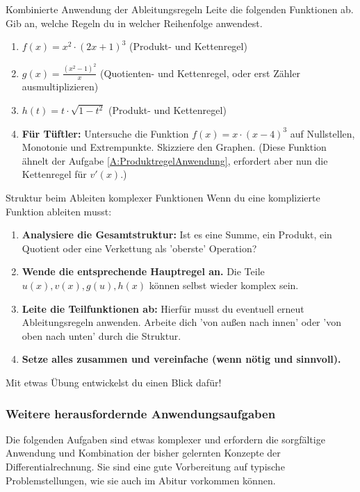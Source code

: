 \begin{aufgabenumgebung}[A:KombinierteAnwendung]{Kombinierte Anwendung der Ableitungsregeln}
Leite die folgenden Funktionen ab. Gib an, welche Regeln du in welcher Reihenfolge anwendest.
\begin{enumerate}
    \item $f(x) = x^2 \cdot (2x+1)^3$ (Produkt- und Kettenregel)
    \item $g(x) = \frac{(x^2-1)^2}{x}$ (Quotienten- und Kettenregel, oder erst Zähler ausmultiplizieren)
    \item $h(t) = t \cdot \sqrt{1-t^2}$ (Produkt- und Kettenregel)
    \item \textbf{Für Tüftler:} Untersuche die Funktion $f(x) = x \cdot (x-4)^3$ auf Nullstellen, Monotonie und Extrempunkte. Skizziere den Graphen. (Diese Funktion ähnelt der Aufgabe \ref{A:ProduktregelAnwendung}, erfordert aber nun die Kettenregel für $v'(x)$.)
\end{enumerate}
\end{aufgabenumgebung}

\begin{tippumgebung}{Struktur beim Ableiten komplexer Funktionen}
Wenn du eine komplizierte Funktion ableiten musst:
\begin{enumerate}
    \item \textbf{Analysiere die Gesamtstruktur:} Ist es eine Summe, ein Produkt, ein Quotient oder eine Verkettung als 'oberste' Operation?
    \item \textbf{Wende die entsprechende Hauptregel an.} Die Teile $u(x), v(x), g(u), h(x)$ können selbst wieder komplex sein.
    \item \textbf{Leite die Teilfunktionen ab:} Hierfür musst du eventuell erneut Ableitungsregeln anwenden. Arbeite dich 'von außen nach innen' oder 'von oben nach unten' durch die Struktur.
    \item \textbf{Setze alles zusammen und vereinfache (wenn nötig und sinnvoll).}
\end{enumerate}
Mit etwas Übung entwickelst du einen Blick dafür!
\end{tippumgebung}



\subsubsection{Weitere herausfordernde Anwendungsaufgaben}
\label{subsubsec:weitere_anwendungen_diff}

Die folgenden Aufgaben sind etwas komplexer und erfordern die sorgfältige Anwendung und Kombination der bisher gelernten Konzepte der Differentialrechnung. Sie sind eine gute Vorbereitung auf typische Problemstellungen, wie sie auch im Abitur vorkommen können.


